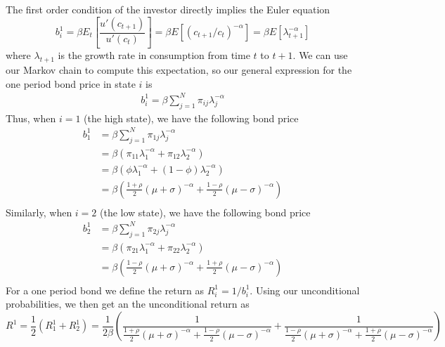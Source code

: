 \documentclass[french]{article}
\begin{document}
\begin{enumerate}[I.]
	The first order condition of the investor directly implies the Euler equation
	\begin{equation*}
		b_i^1 = \beta E_t\left[\frac{u'(c_{t+1})}{u'(c_t)}\right] = \beta E \left[(c_{t+1}/c_t)^{-\alpha}\right] = \beta E\left[\lambda_{t+1}^{-\alpha}\right]
	\end{equation*}
	where $\lambda_{t+1}$ is the growth rate in consumption from time $t$ to $t+1$. We can use our Markov chain to compute this expectation, so our general expression for the one period bond price in state $i$ is 
	\begin{equation}
	\begin{split}
		b^1_i = \beta \sum_{j=1}^{N}\pi_{ij}\lambda_j^{-\alpha}
	\end{split}
	\label{eq:bond_price}
	\end{equation}
	Thus, when $i = 1$ (the high state), we have the following bond price
	\begin{equation*}
	\begin{split}
			b^1_1 &= \beta \sum_{j=1}^{N}\pi_{1j}\lambda_j^{-\alpha}\\
			&=\beta \left(\pi_{11}\lambda_1^{-\alpha} + \pi_{12}\lambda_2^{-\alpha}\right)\\
			&=\beta \left(\phi\lambda_1^{-\alpha} + (1-\phi)\lambda_2^{-\alpha}\right)\\
			&= \beta \left(\frac{1+\rho}{2}(\mu+\sigma)^{-\alpha} + \frac{1-\rho}{2}(\mu-\sigma)^{-\alpha}\right)\\
	\end{split}
	\end{equation*}
	Similarly, when $i=2$ (the low state), we have the following bond price 
		\begin{equation*}
	\begin{split}
	b^1_2 &= \beta \sum_{j=1}^{N}\pi_{2j}\lambda_j^{-\alpha}\\
	&=\beta \left(\pi_{21}\lambda_1^{-\alpha} + \pi_{22}\lambda_2^{-\alpha}\right)\\
	&= \beta \left(\frac{1-\rho}{2}(\mu+\sigma)^{-\alpha} + \frac{1+\rho}{2}(\mu-\sigma)^{-\alpha}\right)\\
	\end{split}
	\end{equation*}
	For a one period bond we define the return as $R^1_i = 1/b^1_i$. Using our unconditional probabilities, we then get an the unconditional return as 
	\begin{equation*}
		R^1 = \frac{1}{2}(R^1_1 + R^1_2) = \frac{1}{2\beta}\left(\frac{1}{\frac{1+\rho}{2}(\mu+\sigma)^{-\alpha} + \frac{1-\rho}{2}(\mu-\sigma)^{-\alpha} }+ \frac{1}{\frac{1-\rho}{2}(\mu+\sigma)^{-\alpha} + \frac{1+\rho}{2}(\mu-\sigma)^{-\alpha}}\right)

\end{equation*}
\end{enumerate}
\end{document}
